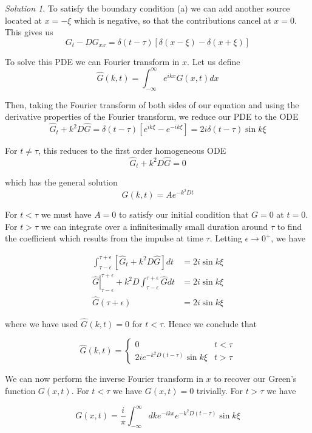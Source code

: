 \documentclass[12pt,a4paper]{article}
\theoremstyle{definition}
\theoremstyle{remark}
\newtheorem*{solution}{Solution}
\begin{document}
\begin{solution}
    To satisfy the boundary condition (a) we can add another source located at $x=-\xi$ which is negative, so that the contributions cancel at $x=0$. This gives us $$G_t - DG_{xx} = \delta(t-\tau)\left[\delta(x-\xi)-\delta(x+\xi)\right]$$

    To solve this PDE we can Fourier transform in $x$. Let us define $$\hat G(k, t) = \int_{-\infty}^\infty e^{ikx} G(x,t) dx$$

    Then, taking the Fourier transform of both sides of our equation and using the derivative properties of the Fourier transform, we reduce our PDE to the ODE $$\hat G_t + k^2 D \hat G = \delta(t-\tau)\left[ e^{ik\xi} - e^{-ik\xi}\right] = 2i \delta(t-\tau)\sin k \xi$$

    For $t \ne \tau$, this reduces to the first order homogeneous ODE $$\hat G_t + k^2 D \hat G = 0$$

    which has the general solution $$\hat G(k, t) = A e^{-k^2 D t}$$

    For $t < \tau$ we must have $A = 0$ to satisfy our initial condition that $G=0$ at $t=0$. For $t>\tau$ we can integrate over a infinitesimally small duration around $\tau$ to find the coefficient which results from the impulse at time $\tau$. Letting $\epsilon \rightarrow 0^+$, we have 

    \begin{align*}
        \int_{\tau -\epsilon}^{\tau + \epsilon} \left[ \hat G_t + k^2 D \hat G \right]dt &= 2 i \sin k \xi \\
        \left. \hat G \right|_{\tau - \epsilon}^{\tau + \epsilon} + k^2 D \int_{\tau -\epsilon}^{\tau + \epsilon} \hat G dt &= 2 i \sin k \xi \\
        \hat G(\tau + \epsilon) &= 2 i \sin k\xi
    \end{align*} 

    where we have used $\hat G(k, t) = 0$ for $t < \tau$. Hence we conclude that 

    $$\hat G(k, t) = \begin{cases}
        0 & t < \tau \\
        2 i e^{-k^2 D(t-\tau)} \sin k \xi  & t > \tau
    \end{cases}$$

    We can now perform the inverse Fourier transform in $x$ to recover our Green's function $G(x,t)$. For $t < \tau$ we have $G(x,t)=0$ trivially. For $t > \tau$ we have 

    $$G(x,t) = \frac{i}{\pi} \int_{-\infty}^\infty dk e^{-ikx}e^{-k^2 D(t-\tau)} \sin k\xi$$


\end{solution}
\end{document}
